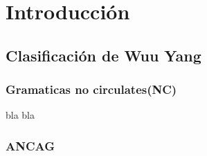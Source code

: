 \chapter{Introducci\'on}
\label{chap:mag}
\minitoc




\section{Clasificaci\'on de Wuu Yang}

\subsection{Gramaticas no circulates(NC)}
bla bla

\subsection{ANCAG}

